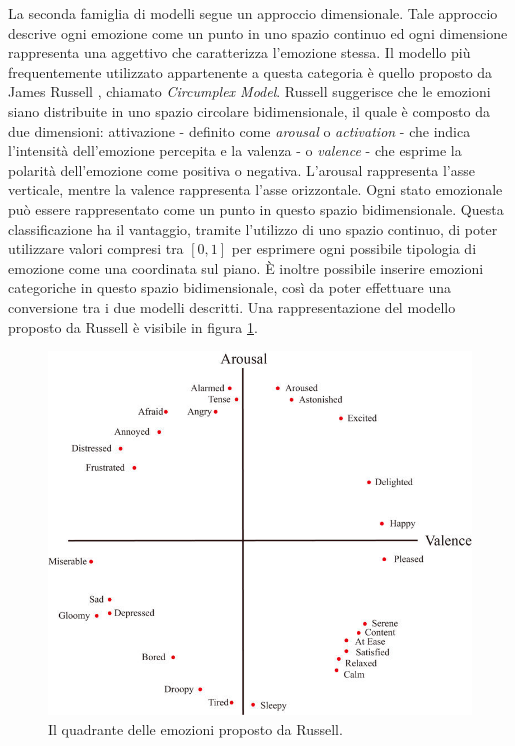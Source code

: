 \documentclass[11pt]{report}
\begin{document}

\newpage

La seconda famiglia di modelli segue un approccio dimensionale. Tale approccio descrive ogni emozione come un punto in uno spazio continuo ed ogni dimensione rappresenta una aggettivo che caratterizza l'emozione stessa. Il modello più frequentemente utilizzato appartenente a questa categoria è quello proposto da James Russell \cite{Russel}, chiamato \textit{Circumplex Model}. Russell suggerisce che le emozioni siano distribuite in uno spazio circolare bidimensionale, il quale è composto da due dimensioni: attivazione - definito come \textit{arousal} o \textit{activation} - che indica l'intensità dell'emozione percepita e la valenza - o \textit{valence} - che esprime la polarità dell'emozione come positiva o negativa. L'arousal rappresenta l'asse verticale, mentre la valence rappresenta l'asse orizzontale. Ogni stato emozionale può essere rappresentato come un punto in questo spazio bidimensionale. Questa classificazione ha il vantaggio, tramite l'utilizzo di uno spazio continuo, di poter utilizzare valori compresi tra $[0,1]$ per esprimere ogni possibile tipologia di emozione come una coordinata sul piano. È inoltre possibile inserire emozioni categoriche in questo spazio bidimensionale, così da poter effettuare una conversione tra i due modelli descritti. Una rappresentazione del modello proposto da Russell è visibile in figura \ref{fig:russell}.

\newpage

\begin{figure}[h]
    \centering
    \includegraphics[scale = 0.38]{img/Russells-circumplex.jpg}
    \caption{Il quadrante delle emozioni proposto da Russell. \cite{seo2019automatic}}
    \label{fig:russell}
\end{figure}
\end{document}
